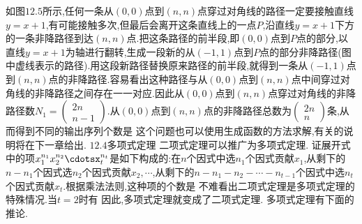 如图$12.5$所示,任何一条从$(0,0)$点到$(n,n)$点穿过对角线的路径一定要接触直线$y=x+1$,有可能接触多次,但最后会离开这条直线上的一点$P$,沿直线$y=x+1$下方的一条非降路径到达$(n,n)$点.把这条路径的前半段,即$(0,0)$点到$P$点的部分,以直线$y=x+1$为轴进行翻转,生成一段新的从$(-1,1)$点到$P$点的部分非降路径(图中虚线表示的路径).用这段新路径替换原来路径的前半段,就得到一条从$(-1,1)$点到$(n,n)$点的非降路径.容易看出这种路径与从$(0,0)$点到$(n,n)$点中间穿过对角线的非降路径之间存在一一对应.因此从$(0,0)$点到$(n,n)$点穿过对角线的非降路径数$N_{1}=\left(\begin{array}{c}2n\\n-1\end{array}\right)$.从$(0,0)$点到$(n,n)$点的非降路径总数为$\left(\begin{array}{c}2n\\n\end{array}\right)$条,从而得到不同的输出序列个数是
这个问题也可以使用生成函数的方法求解,有关的说明将在下一章给出.
{$12.4$多项式定理}
二项式定理可以推广为多项式定理.
证展开式中的项$x_{1}^{n_{1}}x_{2}^{n_{2}}\cdotsx_{t}^{n_{t}}$是如下构成的:在$n$个因式中选$n_{1}$个因式贡献$x_{1}$,从剩下的$n-n_{1}$个因式选$n_{2}$个因式贡献$x_{2},\cdots$,从剩下的$n-n_{1}-n_{2}-\cdots-n_{t-1}$个因式中选$n_{t}$个因式贡献$x_{t}$.根据乘法法则,这种项的个数是
不难看出二项式定理是多项式定理的特殊情况.当$t=2$时有
因此,多项式定理就变成了二项式定理.
多项式定理有下面的推论.
